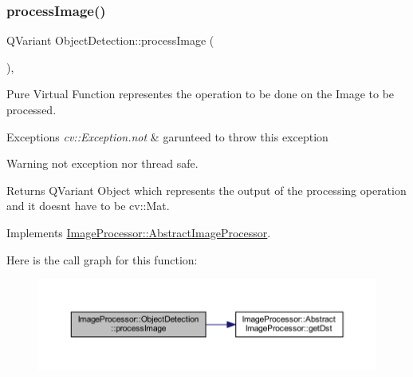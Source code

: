 \subsubsection{\texorpdfstring{process\+Image()}{processImage()}\hspace{0.1cm}{\footnotesize\ttfamily [1/2]}}
{\footnotesize\ttfamily Q\+Variant Object\+Detection\+::process\+Image (\begin{DoxyParamCaption}{ }\end{DoxyParamCaption})\hspace{0.3cm}{\ttfamily [override]}, {\ttfamily [virtual]}}



Pure Virtual Function representes the operation to be done on the Image to be processed. 


\begin{DoxyExceptions}{Exceptions}
{\em cv\+::\+Exception.\+not} & garunteed to throw this exception \\
\hline
\end{DoxyExceptions}
\begin{DoxyWarning}{Warning}
not exception nor thread safe. 
\end{DoxyWarning}
\begin{DoxyReturn}{Returns}
Q\+Variant Object which represents the output of the processing operation and it doesn\textquotesingle{}t have to be cv\+::\+Mat. 
\end{DoxyReturn}


Implements \hyperlink{class_image_processor_1_1_abstract_image_processor_ad033ae911918b0f6842b7b1d6cdd2b90}{Image\+Processor\+::\+Abstract\+Image\+Processor}.

Here is the call graph for this function\+:\nopagebreak
\begin{figure}[H]
\begin{center}
\leavevmode
\includegraphics[width=350pt]{d0/d2b/class_image_processor_1_1_object_detection_ac5561650d95eac1672e2d049ed36201d_cgraph}
\end{center}
\end{figure}
\mbox{\label{class_image_processor_1_1_object_detection_ad8ff5b55d6da63f30dc397082f97370c}} 
